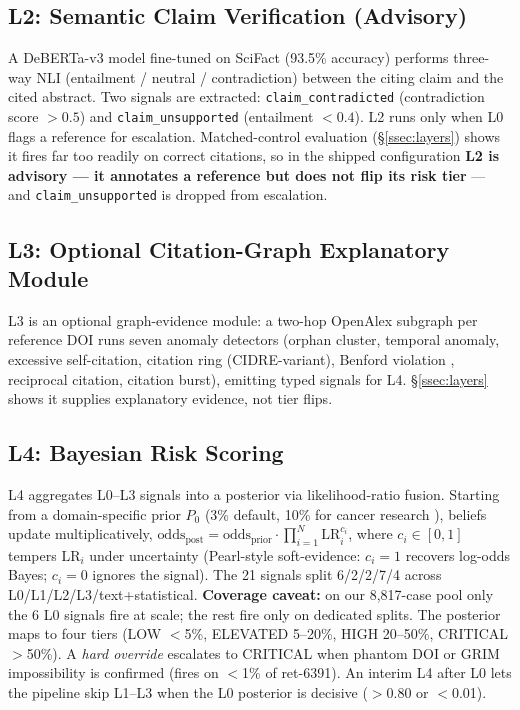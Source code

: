 \documentclass[letterpaper]{article} %
\begin{document}
\subsection{L2: Semantic Claim Verification (Advisory)}

A DeBERTa-v3 model fine-tuned on SciFact \cite{wadden2020fact} (93.5\% accuracy) performs three-way NLI (entailment / neutral / contradiction) between the citing claim and the cited abstract. Two signals are extracted: \texttt{claim\_contradicted} (contradiction score $>0.5$) and \texttt{claim\_unsupported} (entailment $<0.4$). L2 runs only when L0 flags a reference for escalation. Matched-control evaluation (\S\ref{ssec:layers}) shows it fires far too readily on correct citations, so in the shipped configuration \textbf{L2 is advisory --- it annotates a reference but does not flip its risk tier} --- and \texttt{claim\_unsupported} is dropped from escalation.

\subsection{L3: Optional Citation-Graph Explanatory Module}

L3 is an optional graph-evidence module: a two-hop OpenAlex subgraph per reference DOI runs seven anomaly detectors (orphan cluster, temporal anomaly, excessive self-citation, citation ring (CIDRE-variant), Benford violation \cite{campanario2011benford}, reciprocal citation, citation burst), emitting typed signals for L4. \S\ref{ssec:layers} shows it supplies explanatory evidence, not tier flips.

\subsection{L4: Bayesian Risk Scoring}

L4 aggregates L0--L3 signals into a posterior via likelihood-ratio fusion. Starting from a domain-specific prior $P_0$ (3\% default, 10\% for cancer research \citep{scancar2026papermill}), beliefs update multiplicatively, $\text{odds}_{\text{post}} = \text{odds}_{\text{prior}} \cdot \prod_{i=1}^{N} \text{LR}_i^{c_i}$, where $c_i \in [0,1]$ tempers $\text{LR}_i$ under uncertainty (Pearl-style soft-evidence: $c_i{=}1$ recovers log-odds Bayes; $c_i{=}0$ ignores the signal). The 21 signals split 6/2/2/7/4 across L0/L1/L2/L3/text+statistical. \textbf{Coverage caveat:} on our 8{,}817-case pool only the 6 L0 signals fire at scale; the rest fire only on dedicated splits. The posterior maps to four tiers (LOW $<$5\%, ELEVATED 5--20\%, HIGH 20--50\%, CRITICAL $>$50\%). A \emph{hard override} escalates to CRITICAL when phantom DOI or GRIM impossibility is confirmed (fires on $<$1\% of ret-6391). An interim L4 after L0 lets the pipeline skip L1--L3 when the L0 posterior is decisive ($>$0.80 or $<$0.01).
\end{document}
